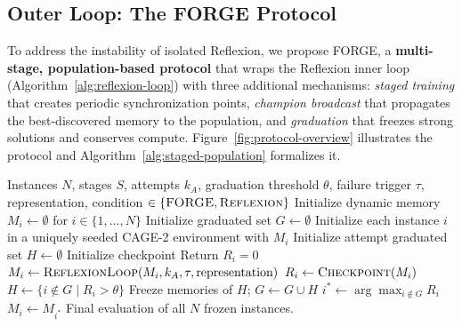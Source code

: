 \documentclass[sigconf]{acmart}
\begin{document}
\subsection{Outer Loop: The FORGE Protocol}
\label{sec:forge-protocol}
To address the instability of isolated Reflexion, we propose FORGE, a \textbf{multi-stage, population-based protocol} that wraps the Reflexion inner loop (Algorithm~\ref{alg:reflexion-loop}) with three additional mechanisms: \emph{staged training} that creates periodic synchronization points, \emph{champion broadcast} that propagates the best-discovered memory to the population, and \emph{graduation} that freezes strong solutions and conserves compute. Figure~\ref{fig:protocol-overview} illustrates the protocol and Algorithm~\ref{alg:staged-population} formalizes it.

\begin{algorithm}[h!]
  \caption{FORGE: Staged Population Memory Training}
  \label{alg:staged-population}
  \begin{algorithmic}[1]
    \Require Instances $N$, stages $S$, attempts $k_A$, graduation threshold $\theta$, failure trigger $\tau$, representation, condition $\in\{\textsc{FORGE},\textsc{Reflexion}\}$
    \State Initialize dynamic memory $M_i \gets \emptyset$ for $i \in \{1,\ldots,N\}$
    \State Initialize graduated set $G \gets \emptyset$
     
      \State Initialize each instance $i$ in a uniquely seeded CAGE-2 environment with $M_i$
      \State Initialize attempt graduated set $H \gets \emptyset$
      \State Initialize checkpoint Return $R_{i}=0$
       
        \State $M_i \gets \textsc{ReflexionLoop}(M_i, k_A, \tau, \text{representation})$ 
        \State $R_i \gets \textsc{Checkpoint}(M_i)$ 
      \EndFor
      \State $H \gets \{ i \notin G \;|\; R_i > \theta \}$ 
      \State Freeze memories of $H$; $G \gets G \cup H$
        \State $i^* \gets \arg\max_{i \notin G} R_i$ 
          \State $M_i \gets M_{i^*}$ 
        \EndFor
      \EndIf
    \EndFor
    \State \Return Final evaluation of all $N$ frozen instances.
  \end{algorithmic}
\end{algorithm}
\end{document}
